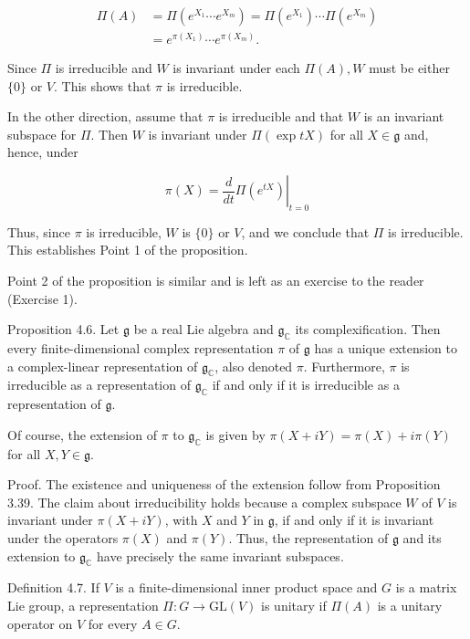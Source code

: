 \documentclass[10pt, letterpaper]{article}
\begin{document}
$$
\begin{aligned}
\Pi(A) & =\Pi\left(e^{X_{1}} \cdots e^{X_{m}}\right)=\Pi\left(e^{X_{1}}\right) \cdots \Pi\left(e^{X_{m}}\right) \\
& =e^{\pi\left(X_{1}\right)} \cdots e^{\pi\left(X_{m}\right)} .
\end{aligned}
$$

Since $\Pi$ is irreducible and $W$ is invariant under each $\Pi(A), W$ must be either $\{0\}$ or $V$. This shows that $\pi$ is irreducible.

In the other direction, assume that $\pi$ is irreducible and that $W$ is an invariant subspace for $\Pi$. Then $W$ is invariant under $\Pi(\exp t X)$ for all $X \in \mathfrak{g}$ and, hence, under

$$
\pi(X)=\left.\frac{d}{d t} \Pi\left(e^{t X}\right)\right|_{t=0}
$$

Thus, since $\pi$ is irreducible, $W$ is $\{0\}$ or $V$, and we conclude that $\Pi$ is irreducible. This establishes Point 1 of the proposition.

Point 2 of the proposition is similar and is left as an exercise to the reader (Exercise 1).

Proposition 4.6. Let $\mathfrak{g}$ be a real Lie algebra and $\mathfrak{g}_{\mathbb{C}}$ its complexification. Then every finite-dimensional complex representation $\pi$ of $\mathfrak{g}$ has a unique extension to a complex-linear representation of $\mathfrak{g}_{\mathbb{C}}$, also denoted $\pi$. Furthermore, $\pi$ is irreducible as a representation of $\mathfrak{g}_{\mathbb{C}}$ if and only if it is irreducible as a representation of $\mathfrak{g}$.

Of course, the extension of $\pi$ to $\mathfrak{g}_{\mathbb{C}}$ is given by $\pi(X+i Y)=\pi(X)+i \pi(Y)$ for all $X, Y \in \mathfrak{g}$.

Proof. The existence and uniqueness of the extension follow from Proposition 3.39. The claim about irreducibility holds because a complex subspace $W$ of $V$ is invariant under $\pi(X+i Y)$, with $X$ and $Y$ in $\mathfrak{g}$, if and only if it is invariant under the operators $\pi(X)$ and $\pi(Y)$. Thus, the representation of $\mathfrak{g}$ and its extension to $\mathfrak{g}_{\mathbb{C}}$ have precisely the same invariant subspaces.

Definition 4.7. If $V$ is a finite-dimensional inner product space and $G$ is a matrix Lie group, a representation $\Pi: G \rightarrow \mathrm{GL}(V)$ is unitary if $\Pi(A)$ is a unitary operator on $V$ for every $A \in G$.
\end{document}

